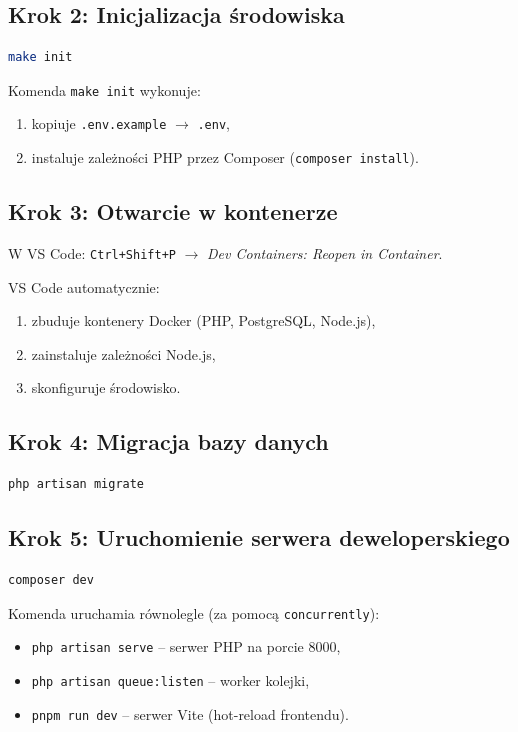 \documentclass[12pt,a4paper]{report}
\begin{document}
\subsection{Krok 2: Inicjalizacja środowiska}

\begin{lstlisting}[language=bash, numbers=none]
make init
\end{lstlisting}

Komenda \texttt{make init} wykonuje:
\begin{enumerate}[noitemsep]
    \item kopiuje \texttt{.env.example} $\to$ \texttt{.env},
    \item instaluje zależności PHP przez Composer (\texttt{composer install}).
\end{enumerate}

\subsection{Krok 3: Otwarcie w kontenerze}

W VS Code: \texttt{Ctrl+Shift+P} $\to$ \textit{Dev Containers: Reopen in Container}.

VS Code automatycznie:
\begin{enumerate}[noitemsep]
    \item zbuduje kontenery Docker (PHP, PostgreSQL, Node.js),
    \item zainstaluje zależności Node.js,
    \item skonfiguruje środowisko.
\end{enumerate}

\subsection{Krok 4: Migracja bazy danych}

\begin{lstlisting}[language=bash, numbers=none]
php artisan migrate
\end{lstlisting}

\subsection{Krok 5: Uruchomienie serwera deweloperskiego}

\begin{lstlisting}[language=bash, numbers=none]
composer dev
\end{lstlisting}

Komenda uruchamia równolegle (za pomocą \texttt{concurrently}):
\begin{itemize}[noitemsep]
    \item \texttt{php artisan serve} -- serwer PHP na porcie 8000,
    \item \texttt{php artisan queue:listen} -- worker kolejki,
    \item \texttt{pnpm run dev} -- serwer Vite (hot-reload frontendu).
\end{itemize}
\end{document}
